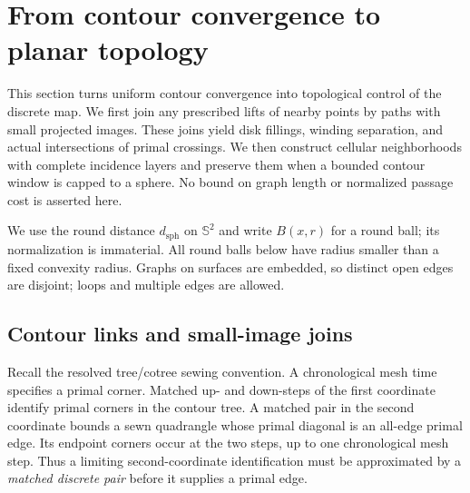 \section{From contour convergence to planar topology}
\label{bg:topology-section}

This section turns uniform contour convergence into topological control
of the discrete map. We first join any prescribed lifts of nearby points
by paths with small projected images. These joins yield disk fillings,
winding separation, and actual intersections of primal crossings. We
then construct cellular neighborhoods with complete incidence layers
and preserve them when a bounded contour window is capped to a sphere.
No bound on graph length or normalized passage cost is asserted here.

We use the round distance $d_{\mathrm{sph}}$ on $\mathbb S^2$ and write
$B(x,r)$ for a round ball; its normalization is immaterial. All round
balls below have radius smaller than a fixed convexity radius. Graphs
on surfaces are embedded, so distinct open edges are disjoint; loops
and multiple edges are allowed.

\subsection{Contour links and small-image joins}

Recall the resolved tree/cotree sewing convention. A chronological mesh
time specifies a primal corner. Matched up- and down-steps of the first
coordinate identify primal corners in the contour tree. A matched pair
in the second coordinate bounds a sewn quadrangle whose primal diagonal
is an all-edge primal edge. Its endpoint corners occur at the two
steps, up to one chronological mesh step. Thus a limiting
second-coordinate identification must be approximated by a
\emph{matched discrete pair} before it supplies a primal edge.

